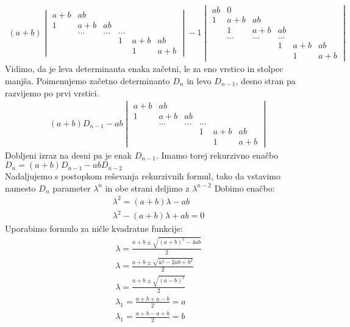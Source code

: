 \documentclass[a4paper,12pt]{article}
\begin{document}
\begin{align*}
(a+b)\begin{vmatrix}
    a+b & ab & & & \\
    1 & a+b & ab \\
      & \dots & \dots & \dots \\
     &  &  & 1 & a+b & ab \\
     & & & & 1 & a+b
\end{vmatrix} -1
\begin{vmatrix}
    ab & 0 & & & \\
    1 & a+b & ab \\
      & 1 & a+b & ab \\
      & \dots & \dots & \dots \\
     &  &  & 1 & a+b & ab \\
     & & & & 1 & a+b
\end{vmatrix}
\end{align*}
Vidimo, da je leva determinanta enaka začetni, le za eno vrstico in stolpec manjša. Poimenujemo začetno determinanto
$D_n$ in levo $D_{n-1}$, desno stran pa razvijemo po prvi vrstici.
\begin{align*} (a+b)D_{n-1}-ab \begin{vmatrix}
    a+b & ab & & & \\
    1 & a+b & ab \\
      & \dots & \dots & \dots \\
     &  &  & 1 & a+b & ab \\
     & & & & 1 & a+b
\end{vmatrix} 
\end{align*}   
Dobljeni izraz  na desni pa je enak $D_{n-1}$. Imamo torej rekurzivno enačbo $D_n = (a+b)D_{n-1} - ab D_{n-2}$  \\
Nadaljujemo s postopkom reševanja rekurzivnih formul, tako da vstavimo namesto $D_n$ parameter $\lambda^n$
in obe strani deljimo z $\lambda^{n-2}$
Dobimo enačbo:
\begin{align*}
    \lambda^2 = (a+b)\lambda - ab \\
    \lambda^2 - (a+b)\lambda + ab = 0
\end{align*} 
Uporabimo formulo za ničle kvadratne funkcije:
\begin{align*}
    \lambda = \frac{a+b \pm \sqrt{(a+b)^2-4ab}}{2} \\
    \lambda = \frac{a+b \pm \sqrt{a^2-2ab+b^2}}{2} \\
    \lambda = \frac{a+b \pm \sqrt{(a-b)^2}}{2} \\
    \lambda_1 = \frac{a+b + a-b}{2} = a \\
    \lambda_1 = \frac{a+b -a+b}{2} = b 
\end{align*}
\end{document}
